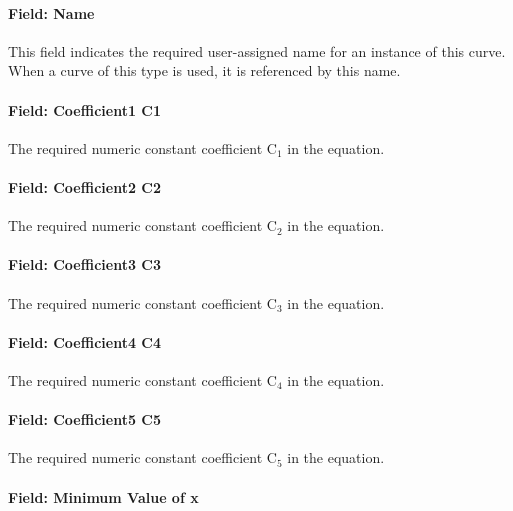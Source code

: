 \paragraph{Field: Name}\label{field-name-18-004}

This field indicates the required user-assigned name for an instance of this curve. When a curve of this type is used, it is referenced by this name.

\paragraph{Field: Coefficient1 C1}\label{field-coefficient1-c1-5}

The required numeric constant coefficient C\(_{1}\) in the equation.

\paragraph{Field: Coefficient2 C2}\label{field-coefficient2-c2-5}

The required numeric constant coefficient C\(_{2}\) in the equation.

\paragraph{Field: Coefficient3 C3}\label{field-coefficient3-c3-5}

The required numeric constant coefficient C\(_{3}\) in the equation.

\paragraph{Field: Coefficient4 C4}\label{field-coefficient4-c4-2}

The required numeric constant coefficient C\(_{4}\) in the equation.

\paragraph{Field: Coefficient5 C5}\label{field-coefficient5-c5-1}

The required numeric constant coefficient C\(_{5}\) in the equation.

\paragraph{Field: Minimum Value of x}\label{field-minimum-value-of-x-17}

